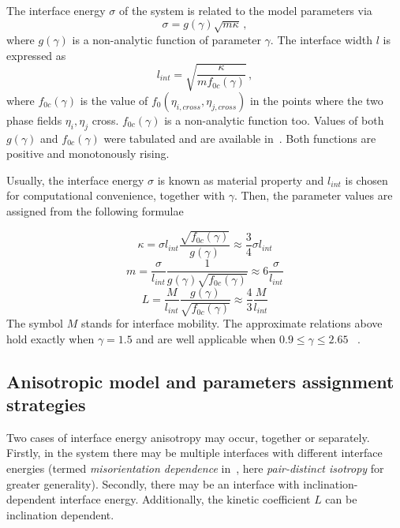 	The interface energy $\sigma$ of the system is related to the model parameters via 
	\begin{equation}\label{eq_IE}
		\sigma = g(\gamma)\sqrt{m\kappa} \,,
	\end{equation}
	where $g(\gamma)$ is a non-analytic function of parameter $\gamma$. The interface width $l$ is expressed as
	\begin{equation} \label{eq_IW}
		l_{int} = \sqrt{\frac{\kappa}{mf_{0c}(\gamma)}} \,,
	\end{equation}
	where $f_{0c}(\gamma)$ is the value of $f_0(\eta_{i,cross},\eta_{j,cross})$ in the points where the two phase fields $\eta_i,\eta_j$ cross. $f_{0c}(\gamma)$ is a non-analytic function too. Values of both $g(\gamma)$ and $f_{0c}(\gamma)$ were tabulated and are available in~\cite{Ravash2017}. Both functions are positive and monotonously rising.
	
	Usually, the interface energy $\sigma$ is known as material property and $l_{int}$ is chosen for computational convenience, together with $\gamma$. Then, the parameter values are assigned from the following formulae
	
	\begin{equation}\label{eq_def_kappa}
		\kappa = \sigma l_{int}\frac{\sqrt{f_{0c}(\gamma)}}{g(\gamma)} \approx \frac{3}{4}\sigma l_{int}
	\end{equation}
	\begin{equation} \label{eq_def_m}
		m = \frac{\sigma}{l_{int}}\frac{1}{g(\gamma)\sqrt{f_{0c}(\gamma)}} \approx 6 \frac{\sigma}{l_{int}}
	\end{equation}
	\begin{equation}\label{eq_def_L}
		L = \frac{M}{l_{int}}\frac{g(\gamma)}{\sqrt{f_{0c}(\gamma)}} \approx \frac{4}{3} \frac{M}{l_{int}}
	\end{equation}
	The symbol $M$ stands for interface mobility. The approximate relations above hold exactly when $\gamma=1.5$ and are well applicable when $0.9 \leq \gamma \leq 2.65$ ~\cite{Moelans2008}. 
	
	\subsection{Anisotropic model and parameters assignment strategies}
	Two cases of interface energy anisotropy may occur, together or separately. Firstly, in the system there may be multiple interfaces with different interface energies (termed \textit{misorientation dependence} in~\cite{Moelans2008}, here \textit{pair-distinct isotropy} for greater generality). Secondly, there may be an interface with inclination-dependent interface energy. Additionally, the kinetic coefficient $L$ can be inclination dependent. 
	
